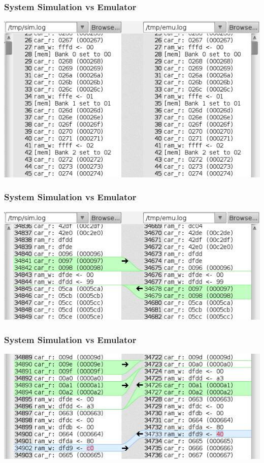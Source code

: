 \documentclass[xcolor=table]{beamer}
\begin{document}
\begin{frame}
    \frametitle{System Simulation vs Emulator}
    \includegraphics[width=\textwidth]{../images/diff_good.png}
\end{frame}

\begin{frame}
    \frametitle{System Simulation vs Emulator}
    \includegraphics[width=\textwidth]{../images/diff_weird.png}
\end{frame}

\begin{frame}
    \frametitle{System Simulation vs Emulator}
    \includegraphics[width=\textwidth]{../images/diff_bad.png}
\end{frame}
\end{document}

